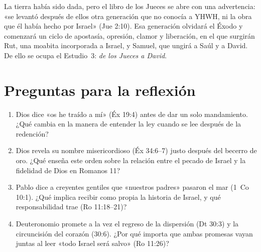 La tierra había sido dada, pero el libro de los Jueces se abre con una advertencia: «se levantó después de ellos otra generación que no conocía a YHWH, ni la obra que él había hecho por Israel» (Jue 2:10). Esa generación olvidará el Éxodo y comenzará un ciclo de apostasía, opresión, clamor y liberación, en el que surgirán Rut, una moabita incorporada a Israel, y Samuel, que ungirá a Saúl y a David. De ello se ocupa el Estudio~3: \emph{de los Jueces a David}.

\section*{Preguntas para la reflexión}
\begin{enumerate}
\item Dios dice «os he traído a mí» (Éx 19:4) antes de dar un solo mandamiento. ¿Qué cambia en la manera de entender la ley cuando se lee después de la redención?
\item Dios revela su nombre misericordioso (Éx 34:6–7) justo después del becerro de oro. ¿Qué enseña este orden sobre la relación entre el pecado de Israel y la fidelidad de Dios en Romanos 11?
\item Pablo dice a creyentes gentiles que «nuestros padres» pasaron el mar (1~Co 10:1). ¿Qué implica recibir como propia la historia de Israel, y qué responsabilidad trae (Ro 11:18–21)?
\item Deuteronomio promete a la vez el regreso de la dispersión (Dt 30:3) y la circuncisión del corazón (30:6). ¿Por qué importa que ambas promesas vayan juntas al leer «todo Israel será salvo» (Ro 11:26)?
\end{enumerate}

